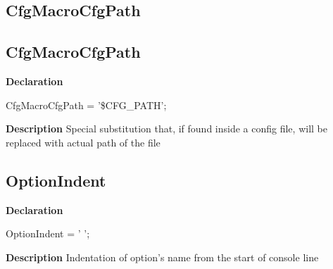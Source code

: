 \documentclass{report}
\newif\ifpdf
\begin{document}
\subsection*{\large{\textbf{CfgMacroCfgPath}}\normalsize\hspace{1ex}\hrulefill}
\else
\subsection*{CfgMacroCfgPath}
\fi
\label{PasDoc_OptionParser-CfgMacroCfgPath}
\begin{list}{}{
\setlength{\itemindent}{0cm}
\setlength{\listparindent}{0cm}
\setlength{\leftmargin}{\evensidemargin}
\addtolength{\leftmargin}{\tmplength}
\settowidth{\labelsep}{X}
\addtolength{\leftmargin}{\labelsep}
\setlength{\labelwidth}{\tmplength}
}
\item[\textbf{Declaration}\hfill]
\ifpdf
\begin{flushleft}
\fi
\begin{ttfamily}
CfgMacroCfgPath = '{\$}CFG{\_}PATH';\end{ttfamily}

\ifpdf
\end{flushleft}
\fi

\par
\item[\textbf{Description}]
Special substitution that, if found inside a config file, will be replaced with actual path of the file

\end{list}
\ifpdf
\subsection*{\large{\textbf{OptionIndent}}\normalsize\hspace{1ex}\hrulefill}
\else
\subsection*{OptionIndent}
\fi
\label{PasDoc_OptionParser-OptionIndent}
\begin{list}{}{
\setlength{\itemindent}{0cm}
\setlength{\listparindent}{0cm}
\setlength{\leftmargin}{\evensidemargin}
\addtolength{\leftmargin}{\tmplength}
\settowidth{\labelsep}{X}
\addtolength{\leftmargin}{\labelsep}
\setlength{\labelwidth}{\tmplength}
}
\item[\textbf{Declaration}\hfill]
\ifpdf
\begin{flushleft}
\fi
\begin{ttfamily}
OptionIndent = '  ';\end{ttfamily}

\ifpdf
\end{flushleft}
\fi

\par
\item[\textbf{Description}]
Indentation of option's name from the start of console line

\end{list}
\ifpdf
\end{document}
